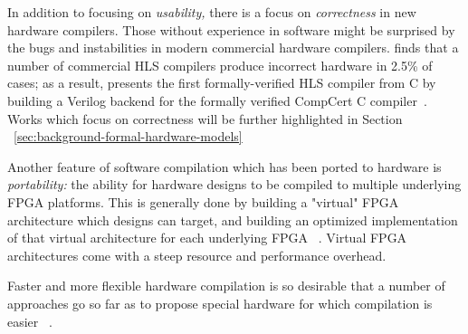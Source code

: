In addition to focusing
  on \textit{usability,}
  there is a focus on
  \textit{correctness}
  in new hardware compilers.
Those without experience
  in software
  might be surprised by
  the bugs
  and instabilities in
  modern commercial
  hardware compilers.
\cite{herklotz2021empirical} finds that
  a number of commercial HLS compilers
  produce incorrect hardware
  in 2.5\% of cases;
  as a result,
  \cite{herklotz2021formal} presents
  the first formally-verified
  HLS compiler from C
  by building a Verilog backend
  for the formally verified CompCert
  C compiler~\cite{leroy2016compcert}.
Works which focus on correctness
  will be further highlighted
  in Section%
  ~\ref{sec:background-formal-hardware-models}
  



  
Another feature of software compilation
  which has been ported
  to hardware
  is \textit{portability:}
  the ability for hardware designs
  to be compiled to 
  multiple underlying
  FPGA platforms.
This is generally done by 
  building a "virtual"
  FPGA architecture
  which designs can target,
  and building an optimized
  implementation
  of that virtual architecture
  for each underlying FPGA%
  ~\cite{lysecky2005firm,brant2012zuma, landgraf2021compiler}.
Virtual FPGA architectures
  come with a steep resource
  and performance overhead.
  
Faster and
  more flexible
  hardware compilation
  is so desirable
  that 
  a number of approaches 
  go so far as to
  propose special 
  hardware for which
  compilation is easier%
  ~\cite{xiao2022pld,lysecky2004configurable,sekanina2000r,lysecky2004dynamic,stitt2003dynamic}.




